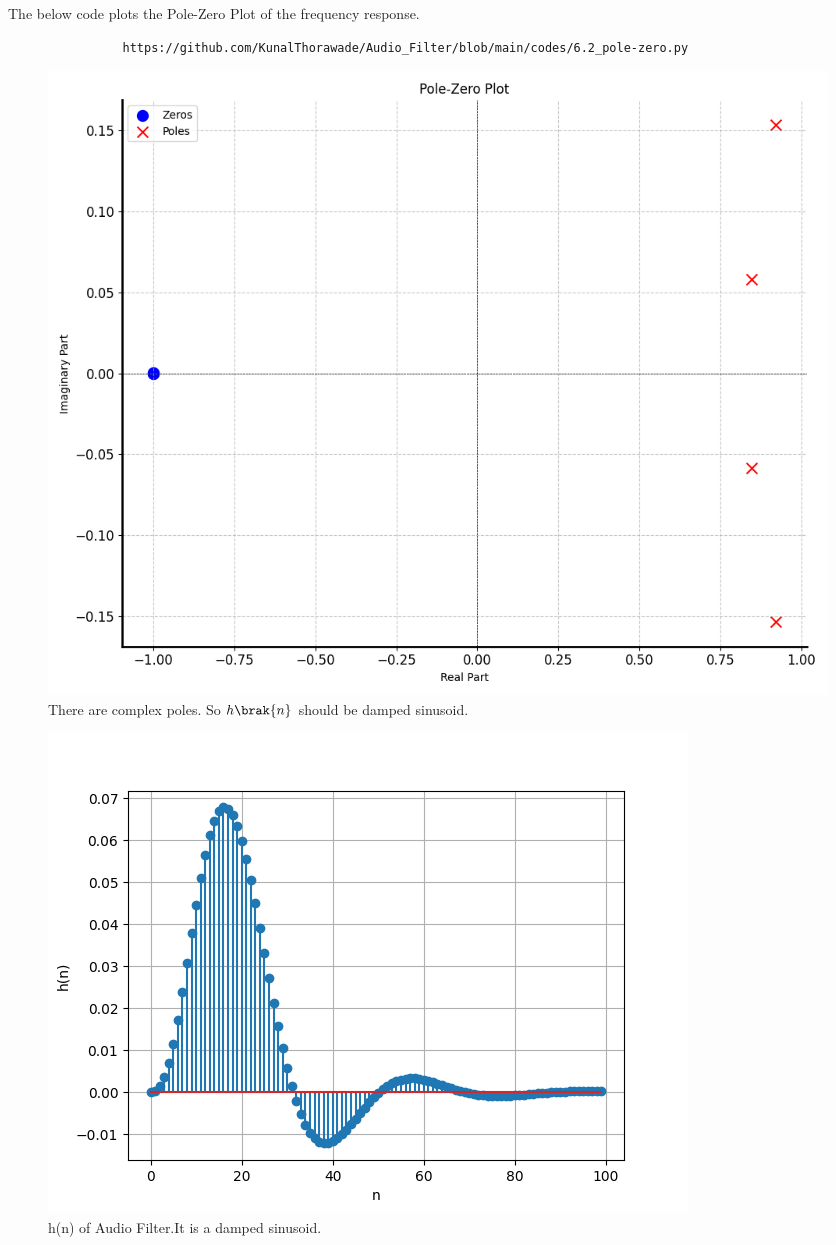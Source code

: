\documentclass[journal,12pt,twocolumn]{IEEEtran}
\theoremstyle{remark}
\begin{document}
\begin{enumerate}[label=\thesection.\arabic*]
				The below code plots the Pole-Zero Plot of the frequency response.
				\begin{lstlisting}
				https://github.com/KunalThorawade/Audio_Filter/blob/main/codes/6.2_pole-zero.py
				\end{lstlisting}
				\begin{figure}[H]
					\centering
					\includegraphics[width=1\columnwidth]{figs/Pole_Zero_Plt.png}
					\caption{There are complex poles. So $h\brak{n}$ should be damped sinusoid.}
					\label{fig:pole_zero_6.2}
				\end{figure}

				\begin{figure}[H]
					\centering
					\includegraphics[width=\columnwidth]{figs/h(n)_6.2.png}
					\caption{h(n) of Audio Filter.It is a damped sinusoid.}
					\label{fig:6.2_hn}
				\end{figure}


\end{enumerate}
\end{document}
